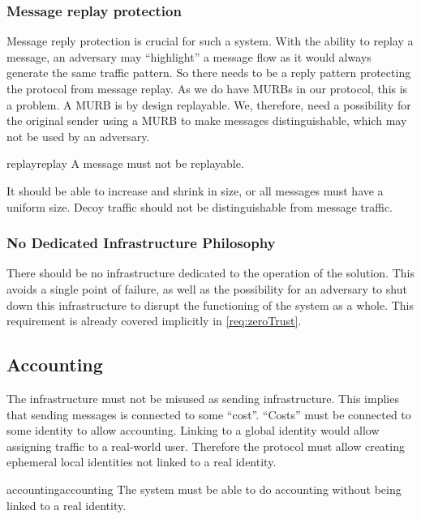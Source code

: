 \subsubsection{Message replay protection}
Message reply protection is crucial for such a system. With the ability to replay a message, an adversary may ``highlight'' a message flow as it would always generate the same traffic pattern. So there needs to be a reply pattern protecting the protocol from message replay. As we do have MURBs in our protocol, this is a problem. A MURB is by design replayable. We, therefore, need a possibility for the original sender using a MURB to make messages distinguishable, which may not be used by an adversary.

\begin{requirement}{replay}{replay}
	A message must not be replayable.
\end{requirement}

It should be able to increase and shrink in size, or all messages must have a uniform size. Decoy traffic should not be distinguishable from message traffic. 

\subsubsection{No Dedicated Infrastructure Philosophy}
There should be no infrastructure dedicated to the operation of the solution. This avoids a single point of failure, as well as the possibility for an adversary to shut down this infrastructure to disrupt the functioning of the system as a whole. This requirement is already covered implicitly in \ref{req:zeroTrust}.

\subsection{Accounting}
The infrastructure must not be misused as  sending infrastructure. This implies that sending messages is connected to some ``cost''. ``Costs'' must be connected to some identity to allow accounting. Linking to a global identity would allow assigning traffic to a real-world user. Therefore the protocol must allow creating ephemeral local identities not linked to a real identity.

\begin{requirement}{accounting}{accounting}
	The system must be able to do accounting without being linked to a real identity.
\end{requirement}

